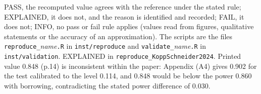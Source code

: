 \begin{table}[!htb]
\begin{minipage}{0.95\linewidth}
\footnotesize
PASS, the recomputed value agrees with the reference under the stated rule; EXPLAINED, it does not, and the reason is identified and recorded; FAIL, it does not; INFO, no pass or fail rule applies (values read from figures, qualitative statements or the accuracy of an approximation). The scripts are the files \texttt{reproduce\_}\textit{name}\texttt{.R} in \texttt{inst/reproduce} and \texttt{validate\_}\textit{name}\texttt{.R} in \texttt{inst/validation}. EXPLAINED in \texttt{reproduce\_KoppSchneider2024}. Printed value 0.848 (p.14) is inconsistent within the paper: Appendix (A4) gives 0.902 for the test calibrated to the level 0.114, and 0.848 would be below the power 0.860 with borrowing, contradicting the stated power difference of 0.030.
\end{minipage}
\end{table}
